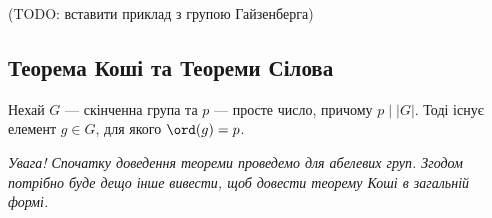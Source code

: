 \documentclass{math_library}
\begin{document}
(TODO: вставити приклад з групою Гайзенберга)

\subsection{Теорема Коші та Теореми Сілова}
\begin{theorem}
Нехай $G$ --- скінченна група та $p$ --- просте число, причому $p \mid |G|$. Тоді існує елемент $g \in G$, для якого $\ord(g) = p$.
\end{theorem}

\textit{Увага! Спочатку доведення теореми проведемо для абелевих груп. Згодом потрібно буде дещо інше вивести, щоб довести теорему Коші в загальній формі.}
\end{document}
